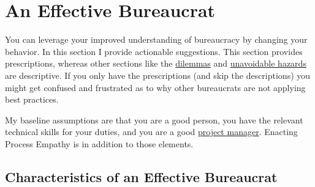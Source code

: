 \section{An Effective Bureaucrat\label{sec:effective-bureaucrat}}

You can leverage your improved understanding of bureaucracy by changing your behavior. In this section I provide actionable suggestions. This section provides prescriptions, whereas other sections like the  
%
\hyperref[sec:dilemma-trilemma]{dilemmas} 
and 
\hyperref[sec:unavoidable-hazards]{unavoidable hazards} are descriptive. If you only have the prescriptions (and skip the descriptions) you might get confused and frustrated as to why other bureaucrats are not applying best practices. 


My baseline assumptions are that you are a good person, you have the relevant technical skills for your duties, and you are a good \href{https://en.wikipedia.org/wiki/Project_management}{project manager}.
\iftoggle{WPinmargin}{\marginpar{$>$Wikipedia: project management}}{}
Enacting Process Empathy is in addition to those elements. 

\subsection*{Characteristics of an Effective Bureaucrat}

